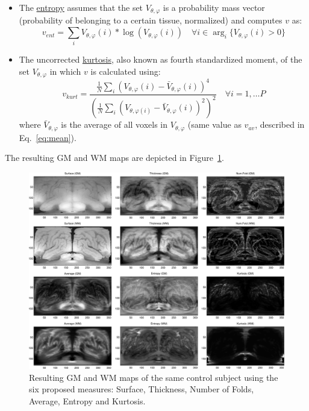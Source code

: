 \begin{itemize}
	\item The \underline{entropy} assumes that the set $V_{\theta,\varphi}$ is a probability mass vector (probability of belonging to a certain tissue, normalized) and computes $v$ as:
	\begin{equation}
	v_{ent}=\sum_i V_{\theta,\varphi}(i)*\log(V_{\theta,\varphi}(i)) \quad \forall i \in \arg_i\lbrace V_{\theta,\varphi}(i)>0\rbrace
	\end{equation}
	
	\item The uncorrected \underline{kurtosis}, also known as fourth standardized moment, of the set $V_{\theta,\varphi}$ in which $v$ is calculated using:
	\begin{equation}
	v_{kurt}= \frac{\frac{1}{N}\sum_i\left(V_{\theta,\varphi}(i)-\bar{V}_{\theta,\varphi}(i)\right)^4}{\left(\frac{1}{N}\sum_i\left(V_{\theta,\varphi(i)}-\bar{V}_{\theta,\varphi}(i)\right)^2\right)^2} \quad \forall i=1,\dots P
	\end{equation}
	where $\bar{V}_{\theta,\varphi}$ is the average of all voxels in $V_{\theta,\varphi}$ (same value as $v_{av}$, described in Eq.~\ref{eq:mean}). 
	
\end{itemize}

The resulting \ac{GM} and \ac{WM} maps are depicted in Figure~\ref{fig:masksGM}. 

\begin{figure}[htp]
	\centering
	\includegraphics[width=1\textwidth]{gfx/ch6/03-projections}
	
	\caption{Resulting \ac{GM} and \ac{WM} maps of the same control subject using the six proposed measures: Surface, Thickness, Number of Folds, Average, Entropy and Kurtosis.}
	\label{fig:masksGM}
\end{figure}

